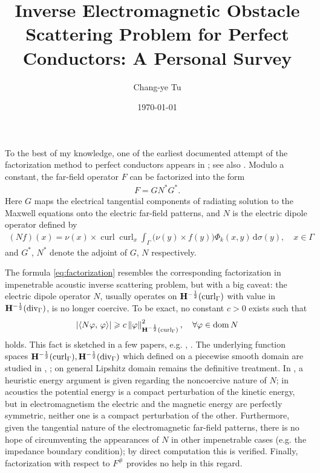 \documentclass[a4paper,12pt]{article}
\theoremstyle{definition}
\newcommand\bdr{\Gamma}
\newcommand\Div{\divv_\bdr}
\newcommand\Curl{\curl_\bdr}
\newcommand\Hhm{{\bf H}^{-\frac{1}{2}}}
\newcommand\lTD{\Hhm(\Div)}
\newcommand\lTC{\Hhm(\Curl)}
\newcommand\ints[2][y]{\int_{\bdr}#2\,\text{d}\sigma(#1)}
\DeclareMathOperator\curl{curl}
\DeclareMathOperator\divv{div}
\DeclareMathOperator\dom{dom}
\begin{document}
\author{Chang-ye Tu}
\title{Inverse Electromagnetic Obstacle Scattering Problem for Perfect Conductors: A Personal Survey}
\date{\today}
\maketitle

To the best of my knowledge, one of the earliest documented attempt of the factorization method to perfect conductors appears in \citet[Theorem 8.4, pp. 201]{kress02}; see also \citet[pp. 260]{colton13}. Modulo a constant, the far-field operator $F$ can be factorized into the form  
\begin{align}\label{eq:factorization}
  F = G N^* G^*.
\end{align}
Here $G$ maps the electrical tangential components of radiating solution to the Maxwell equations onto the electric far-field patterns, and $N$ is the electric dipole operator defined by
\begin{align}
  (N f)(x) = \nu(x)\times\curl\curl_x\ints{\big(\nu(y)\times f(y)\big)\Phi_k(x,y)},\quad x\in\bdr
\end{align}
and $G^*$, $N^*$ denote the adjoint of $G$, $N$ respectively.

The formula \ref{eq:factorization} resembles the corresponding factorization in impenetrable acoustic inverse scattering problem, but with a big caveat: the electric dipole operator $N$, usually operates on $\lTC$ with value in $\lTD$, is no longer coercive. To be exact, no constant $c > 0$ exists such that
\begin{align*}
    \left|\left\langle N\varphi,\,\varphi\right\rangle\right|\geqslant c\left\|\varphi\right\|_{\lTC}^2,\quad\forall\varphi\in\dom N
\end{align*}
holds. This fact is sketched in a few papers, e.g. \citet{hiptmairschwab}, \citet{hiptmair03}. The underlying function spaces $\lTC, \lTD$ which defined on a piecewise smooth domain are studied in \citet{buffaciarlet1}, \cite{buffaciarlet2}; on general Lipshitz domain \citet{buffasheen} remains the definitive treatment. In \citet{hiptmair03}, a heuristic energy argument is given regarding the noncoercive nature of $N$; in acoustics the potential energy is a compact perturbation of the kinetic energy, but in electromagnetism the electric and the magnetic energy are perfectly symmetric, neither one is a compact perturbation of the other. Furthermore, given the tangential nature of the electromagnetic far-field patterns, there is no hope of circumventing the appearances of $N$ in other impenetrable cases (e.g. the impedance boundary condition); by direct computation this is verified. Finally, factorization with respect to $F^\#$ provides no help in this regard.     
\end{document}

